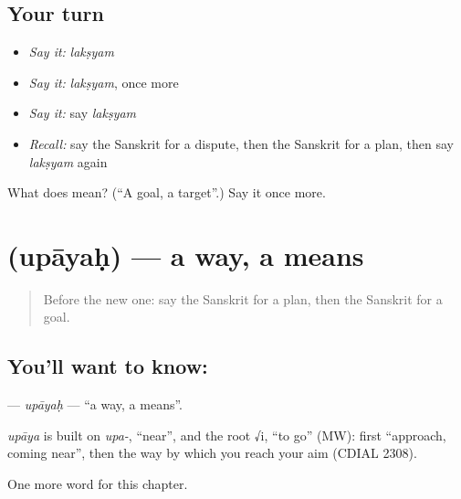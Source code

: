 \subsection*{Your turn}
\begin{itemize}
\raggedright
  \item \emph{Say it:} \emph{lakṣyam}
  \item \emph{Say it:} \emph{lakṣyam}, once more
  \item \emph{Say it:} say \emph{lakṣyam}
  \item \emph{Recall:} say the Sanskrit for a dispute, then the Sanskrit for a plan, then say \emph{lakṣyam} again
\end{itemize}

\begin{tcolorbox}[breakable,colback=teal!4,colframe=teal!35!black,title={Before you move on}]
What does  mean? (\textquotedblleft{}A goal, a target\textquotedblright{}.) Say it once more.
\end{tcolorbox}
\section[\texorpdfstring{\sk{उपायः} (upāyaḥ)}{उपायः (upāyaḥ)}]{ (upāyaḥ) — a way, a means}

\label{lesson:SA-C201-upayah}



\begin{quote}
Before the new one: say the Sanskrit for a plan, then the Sanskrit for a goal.
\end{quote}

\subsection*{You'll want to know: }
\textbf{} — \emph{upāyaḥ} — \textquotedblleft{}a way, a means\textquotedblright{}.

\begin{cousinweb}
\emph{upāya} is built on \emph{upa-}, \textquotedblleft{}near\textquotedblright{}, and the root √i, \textquotedblleft{}to go\textquotedblright{} (MW): first \textquotedblleft{}approach, coming near\textquotedblright{}, then the way by which you reach your aim (CDIAL 2308).
\end{cousinweb}

\begin{grammarlens}[title={What you've built}]
One more word for this chapter.
\end{grammarlens}

